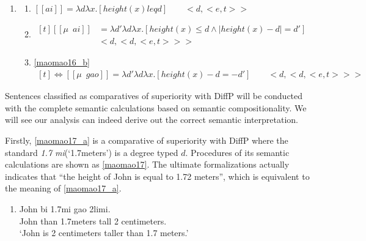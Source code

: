 \documentclass{ctexart}
\begin{document}
\begin{enumerate}
    \item \label{maomao16}
    \begin{enumerate}
        \item \label{maomao16_a}
        $[\![ai]\!] = \lambda d \lambda x.[height(x) leq d] \qquad <d,<e,t>>$

        \item \label{maomao16_b}
        $\begin{aligned}[t]
            [\![\mu \enspace ai]\!] &= \lambda d' \lambda d \lambda x.[height(x) \leq d \land |height(x) - d|=d'] \\
            & <d,<d,<e,t>>>
        \end{aligned}$
        
        \item \label{maomao16_c}
        \ref{maomao16_b}
        $\begin{aligned}[t]
            \Leftrightarrow [\![\mu \enspace gao]\!] = \lambda d' \lambda d \lambda x.[height(x)-d=-d'] \qquad <d,<d,<e,t>>>
        \end{aligned}$
    \end{enumerate}
\end{enumerate}

Sentences classified as comparatives of superiority with DiffP will be conducted with the complete semantic calculations based on semantic compositionality. We will see our analysis can indeed derive out the correct semantic interpretation.

Firstly, \ref{maomao17_a} is a comparative of superiority with DiffP where the standard \textit{1.7 mi}(`1.7meters') is a degree typed $d$. Procedures of its semantic calculations are shown as \ref{maomao17}. The ultimate formalizations actually indicates that ``the height of John is equal to 1.72 meters'', which is equivalent to the meaning of \ref{maomao17_a}.

\begin{enumerate}
    \item \label{maomao17_a}
    John bi \enspace \enspace 1.7mi \enspace \enspace \enspace \enspace gao \enspace \enspace 2limi. \\
    John than 1.7meters tall 2 centimeters. \\
    `John is 2 centimeters taller than 1.7 meters.'
\end{enumerate}
\end{document}
